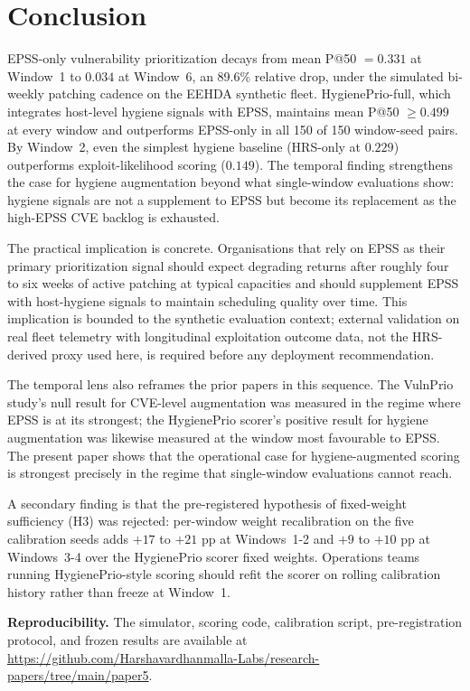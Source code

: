 \section{Conclusion}
\label{sec:conclusion}

EPSS-only vulnerability prioritization decays from mean P@50 $= 0.331$ at Window~1 to $0.034$ at Window~6, an 89.6\% relative drop, under the simulated bi-weekly patching cadence on the EEHDA synthetic fleet. HygienePrio-full, which integrates host-level hygiene signals with EPSS, maintains mean P@50 $\geq 0.499$ at every window and outperforms EPSS-only in all 150 of 150 window-seed pairs. By Window~2, even the simplest hygiene baseline (HRS-only at $0.229$) outperforms exploit-likelihood scoring ($0.149$). The temporal finding strengthens the case for hygiene augmentation beyond what single-window evaluations show: hygiene signals are not a supplement to EPSS but become its replacement as the high-EPSS CVE backlog is exhausted.

The practical implication is concrete. Organisations that rely on EPSS as their primary prioritization signal should expect degrading returns after roughly four to six weeks of active patching at typical capacities and should supplement EPSS with host-hygiene signals to maintain scheduling quality over time. This implication is bounded to the synthetic evaluation context; external validation on real fleet telemetry with longitudinal exploitation outcome data, not the HRS-derived proxy used here, is required before any deployment recommendation.

The temporal lens also reframes the prior papers in this sequence. The VulnPrio study's null result for CVE-level augmentation was measured in the regime where EPSS is at its strongest; the HygienePrio scorer's positive result for hygiene augmentation was likewise measured at the window most favourable to EPSS. The present paper shows that the operational case for hygiene-augmented scoring is strongest precisely in the regime that single-window evaluations cannot reach.

A secondary finding is that the pre-registered hypothesis of fixed-weight sufficiency (H3) was rejected: per-window weight recalibration on the five calibration seeds adds $+17$ to $+21$ pp at Windows~1-2 and $+9$ to $+10$ pp at Windows~3-4 over the HygienePrio scorer fixed weights. Operations teams running HygienePrio-style scoring should refit the scorer on rolling calibration history rather than freeze at Window~1.

\textbf{Reproducibility.} The simulator, scoring code, calibration script, pre-registration protocol, and frozen results are available at \url{https://github.com/Harshavardhanmalla-Labs/research-papers/tree/main/paper5}.

